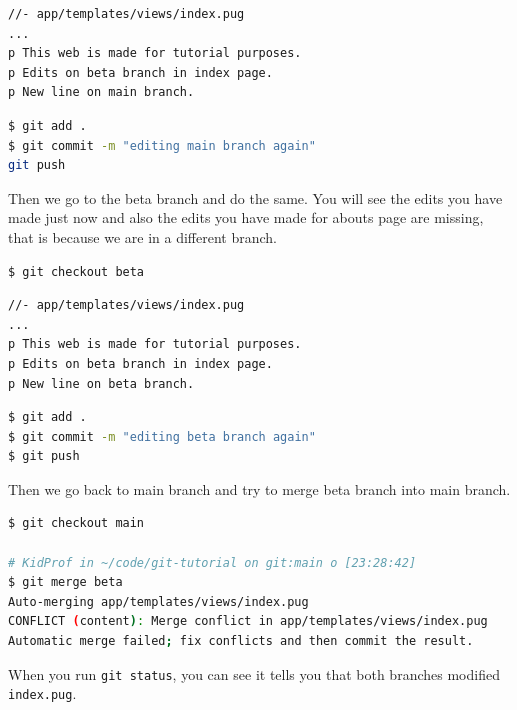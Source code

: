 \begin{lstlisting}[language=pug]
//- app/templates/views/index.pug
...
p This web is made for tutorial purposes.
p Edits on beta branch in index page.
p New line on main branch.
\end{lstlisting}

\begin{lstlisting}[language=bash]
$ git add .
$ git commit -m "editing main branch again"
git push
\end{lstlisting}
\vspace{6mm}

Then we go to the beta branch and do the same. You will see the edits you have made just now and also the edits you have made for abouts page are missing, that is because we are in a different branch.
\vspace{6mm}

\begin{lstlisting}[language=bash]
$ git checkout beta
\end{lstlisting}

\begin{lstlisting}[language=pug]
//- app/templates/views/index.pug
...
p This web is made for tutorial purposes.
p Edits on beta branch in index page.
p New line on beta branch.
\end{lstlisting}

\begin{lstlisting}[language=bash]
$ git add .
$ git commit -m "editing beta branch again"
$ git push
\end{lstlisting}
\vspace{6mm}

Then we go back to main branch and try to merge beta branch into main branch.
\vspace{6mm}

\begin{lstlisting}[language=bash]
$ git checkout main

# KidProf in ~/code/git-tutorial on git:main o [23:28:42]
$ git merge beta
Auto-merging app/templates/views/index.pug
CONFLICT (content): Merge conflict in app/templates/views/index.pug
Automatic merge failed; fix conflicts and then commit the result.
\end{lstlisting}
\vspace{6mm}

When you run \texttt{git status}, you can see it tells you that both branches modified \texttt{index.pug}.
\vspace{6mm}

